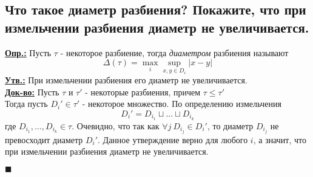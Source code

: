 
\subsection{Что такое диаметр разбиения? Покажите, что при измельчении разбиения диаметр не увеличивается.} 

\textbf{\underline{Опр.:} } Пусть $\tau$ - некоторое разбиение, тогда \textit{диаметром} разбиения называют
\[\Delta(\tau) = \max_i{\sup_{x,y\in D_i}{|x - y|}}\]
\textbf{\underline{Утв.:} } При измельчении разбиения его диаметр не увеличивается.\\
\textbf{\underline{Док-во:} } Пусть $\tau$ и $\tau'$ - некоторые разбиения, причем $\tau \leq \tau'$ \\
Тогда пусть $D_i' \in \tau'$ - некоторое множество. По определению измельчения 
\[D_i' = D_{i_1}\sqcup ... \sqcup D_{i_k}\]
где $D_{i_1}, ..., D_{i_k} \in \tau$. Очевидно, что так как $\forall j \ D_{i_j} \in D_i'$, то диаметр $D_{i_j}$ не превосходит диаметр $D_i'$. Данное утверждение верно для любого $i$, а значит, что при измельчении разбиения диаметр не увеличивается.
\begin{flushright}
$\blacksquare$
\end{flushright}

